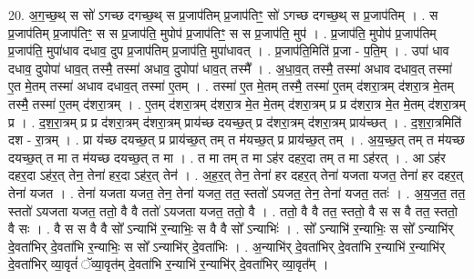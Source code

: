 \documentclass[17pt]{extarticle}
\begin{document}
20. अ॒ग॒च्छ॒थ् स सो॑ ऽगच्छ दगच्छ॒थ् स प्र॒जाप॑तिम् प्र॒जाप॑तिꣳ॒॒ सो॑ ऽगच्छ दगच्छ॒थ् स प्र॒जाप॑तिम् । . स प्र॒जाप॑तिम् प्र॒जाप॑तिꣳ॒॒ स स प्र॒जाप॑ति॒ मुपोप॑ प्र॒जाप॑तिꣳ॒॒ स स प्र॒जाप॑ति॒ मुप॑ । . प्र॒जाप॑ति॒ मुपोप॑ प्र॒जाप॑तिम् प्र॒जाप॑ति॒ मुपा॑धाव दधाव॒ दुप प्र॒जाप॑तिम् प्र॒जाप॑ति॒ मुपा॑धावत् । . प्र॒जाप॑ति॒मिति॑ प्र॒जा - प॒ति॒म् । . उपा॑ धाव दधाव॒ दुपोपा॑ धाव॒त् तस्मै॒ तस्मा॑ अधाव॒ दुपोपा॑ धाव॒त् तस्मै᳚ । . अ॒धा॒व॒त् तस्मै॒ तस्मा॑ अधाव दधाव॒त् तस्मा॑ ए॒त मे॒तम् तस्मा॑ अधाव दधाव॒त् तस्मा॑ ए॒तम् । . तस्मा॑ ए॒त मे॒तम् तस्मै॒ तस्मा॑ ए॒तम् द॑शरा॒त्रम् द॑शरा॒त्र मे॒तम् तस्मै॒ तस्मा॑ ए॒तम् द॑शरा॒त्रम् । . ए॒तम् द॑शरा॒त्रम् द॑शरा॒त्र मे॒त मे॒तम् द॑शरा॒त्रम् प्र प्र द॑शरा॒त्र मे॒त मे॒तम् द॑शरा॒त्रम् प्र । . द॒श॒रा॒त्रम् प्र प्र द॑शरा॒त्रम् द॑शरा॒त्रम् प्राय॑च्छ दयच्छ॒त् प्र द॑शरा॒त्रम् द॑शरा॒त्रम् प्राय॑च्छत् । . द॒श॒रा॒त्रमिति॑ दश - रा॒त्रम् । . प्रा य॑च्छ दयच्छ॒त् प्र प्राय॑च्छ॒त् तम् त म॑यच्छ॒त् प्र प्राय॑च्छ॒त् तम् । . अ॒य॒च्छ॒त् तम् त म॑यच्छ दयच्छ॒त् त मा त म॑यच्छ दयच्छ॒त् त मा । . त मा तम् त मा ऽह॑र दहर॒दा तम् त मा ऽह॑रत् । . आ ऽह॑र दहर॒दा ऽह॑र॒त् तेन॒ तेना॑ हर॒दा ऽह॑र॒त् तेन॑ । . अ॒ह॒र॒त् तेन॒ तेना॑ हर दहर॒त् तेना॑ यजता यजत॒ तेना॑ हर दहर॒त् तेना॑ यजत । . तेना॑ यजता यजत॒ तेन॒ तेना॑ यजत॒ तत॒ स्ततो॑ ऽयजत॒ तेन॒ तेना॑ यजत॒ ततः॑ । . अ॒य॒ज॒त॒ तत॒ स्ततो॑ ऽयजता यजत॒ ततो॒ वै वै ततो॑ ऽयजता यजत॒ ततो॒ वै । . ततो॒ वै वै तत॒ स्ततो॒ वै स स वै तत॒ स्ततो॒ वै सः । . वै स स वै वै सो᳚ ऽन्याभि॑ र॒न्याभिः॒ स वै वै सो᳚ ऽन्याभिः॑ । . सो᳚ ऽन्याभि॑ र॒न्याभिः॒ स सो᳚ ऽन्याभि॑र् दे॒वता॑भिर् दे॒वता॑भि र॒न्याभिः॒ स सो᳚ ऽन्याभि॑र् दे॒वता॑भिः । . अ॒न्याभि॑र् दे॒वता॑भिर् दे॒वता॑भि र॒न्याभि॑ र॒न्याभि॑र् दे॒वता॑भिर् व्या॒वृतं॑ ॅव्या॒वृत॑म् दे॒वता॑भि र॒न्याभि॑ र॒न्याभि॑र् दे॒वता॑भिर् व्या॒वृत᳚म् । \newline
\end{document}

